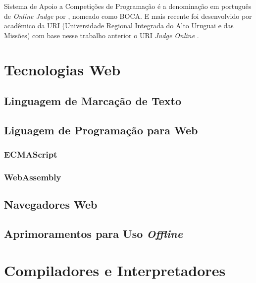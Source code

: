 {Sistema de Apoio a Competições de Programação é a denominação em português de
\textit{Online Judge} por , nomeado como BOCA.
E mais recente foi desenvolvido por acadêmico da URI (Universidade Regional
Integrada do Alto Uruguai e das Missões) com base nesse trabalho anterior o URI
\textit{Judge Online} \cite{tonin2012etal}.

\section{Tecnologias Web}

\subsection{Linguagem de Marcação de Texto}

\subsection{Liguagem de Programação para Web}

\subsubsection{ECMAScript}

\subsubsection{WebAssembly}

\subsection{Navegadores Web}

\subsection{Aprimoramentos para Uso \textit{Offline}}

\section{Compiladores e Interpretadores}


}

